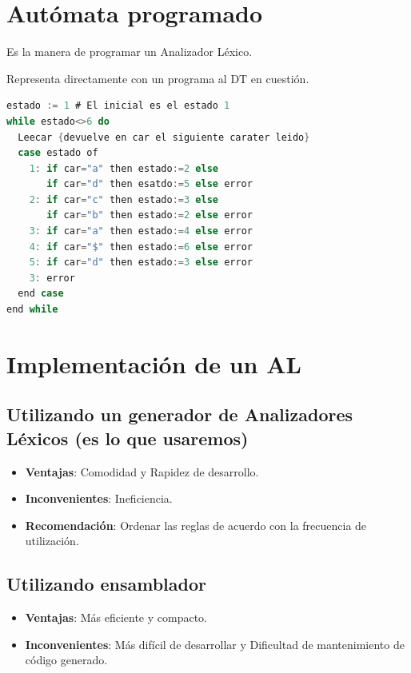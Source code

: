 \documentclass[12pt, twoside, openright]{report} %
\begin{document}
\begin{figure}[H]
  {\def\svgwidth{.9\textwidth}
  }
\end{figure}

\section{Autómata programado}

Es la manera de programar un Analizador Léxico.

Representa directamente con un programa al DT en cuestión.

\begin{lstlisting}[language=C]
estado := 1 # El inicial es el estado 1
while estado<>6 do
  Leecar {devuelve en car el siguiente carater leido}
  case estado of
    1: if car="a" then estado:=2 else
       if car="d" then esatdo:=5 else error
    2: if car="c" then estado:=3 else
       if car="b" then estado:=2 else error
    3: if car="a" then estado:=4 else error
    4: if car="$" then estado:=6 else error
    5: if car="d" then estado:=3 else error
    3: error
  end case
end while
\end{lstlisting}

\section{Implementación de un AL}

\subsection{Utilizando un generador de Analizadores Léxicos (es lo que usaremos)}

\begin{itemize}
\item
  \textbf{Ventajas}: Comodidad y Rapidez de desarrollo.
\item
  \textbf{Inconvenientes}: Ineficiencia.
\item
  \textbf{Recomendación}: Ordenar las reglas de acuerdo con la frecuencia
  de utilización.
\end{itemize}


\subsection{Utilizando ensamblador}

\begin{itemize}

\item
  \textbf{Ventajas}: Más eficiente y compacto.
\item
  \textbf{Inconvenientes}: Más difícil de desarrollar y Dificultad de
  mantenimiento de código generado.
\end{itemize}
\end{document}
